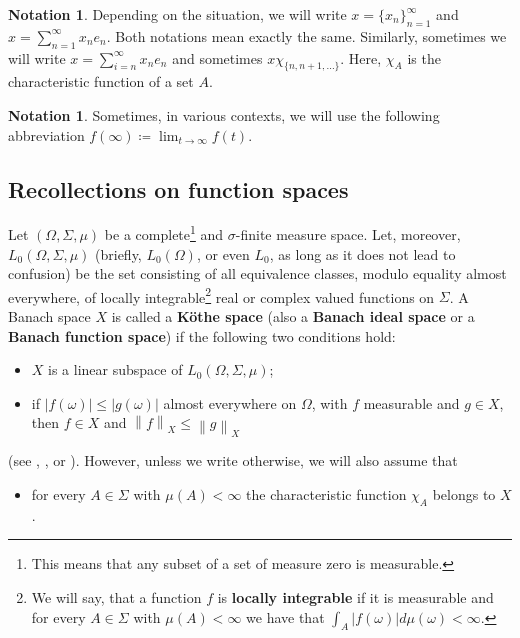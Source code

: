 \documentclass[11pt]{amsart}
\theoremstyle{definition}
\theoremstyle{definition}
\theoremstyle{definition}
\theoremstyle{definition}
\theoremstyle{definition}
\theoremstyle{definition}
\theoremstyle{definition}
\theoremstyle{definition}
\numberwithin{equation}{section}
\numberwithin{equation}{section}
\numberwithin{equation}{section}
\theoremstyle{definition}
\theoremstyle{definition}
\newtheorem{notation}[theorem]{Notation}
\theoremstyle{definition}
\theoremstyle{definition}
\theoremstyle{definition}
\theoremstyle{definition}
\newcommand{\norm}[1]{\left\lVert#1\right\rVert}
\newcommand{\abs}[1]{\left\lvert#1\right\rvert}
\begin{document}
\begin{notation}
	Depending on the situation, we will write $x = \{ x_n \}_{n=1}^{\infty}$ and $x = \sum_{n=1}^{\infty} x_n e_n$.
	Both notations mean exactly the same. Similarly, sometimes we will write $x = \sum_{i=n}^{\infty} x_n e_n$ and
	sometimes $x\chi_{\{n,n+1,...\}}$. Here, $\chi_A$ is the characteristic function of a set $A$.
\end{notation}

\begin{notation}
	Sometimes, in various contexts, we will use the following abbreviation $f(\infty) \coloneqq \lim_{t \rightarrow \infty} f(t)$.
\end{notation}

\subsection{Recollections on function spaces}
Let $(\Omega, \Sigma, \mu)$ be a complete\footnote{This means that any subset of a set of measure zero is measurable.} and
$\sigma$-finite measure space. Let, moreover, $L_0(\Omega,\Sigma,\mu)$ (briefly, $L_0(\Omega)$, or even $L_0$, as long as it does
not lead to confusion) be the set consisting of all equivalence classes, modulo equality almost everywhere, of locally
integrable\footnote{We will say, that a function $f$ is {\bf locally integrable} if it is measurable and for every $A \in \Sigma$
with $\mu(A) < \infty$ we have that $\int_{A} \abs{f(\omega)} d\mu(\omega) < \infty$.} real or complex valued functions on $\Sigma$.
A Banach space $X$ is called a {\bf K{\" o}the space} (also a {\bf Banach ideal space} or a {\bf Banach function space}) if the following two conditions hold:
\begin{itemize}
	\item[$\bullet$] $X$ is a linear subspace of $L_0(\Omega,\Sigma,\mu)$;
	\item[$\bullet$] if $\abs{f(\omega)} \leqslant \abs{g(\omega)}$ almost everywhere on $\Omega$, with $f$ measurable
	and $g \in X$, then $f \in X$ and $\norm{f}_X \leqslant \norm{g}_X$
\end{itemize}
(see \cite[pp.~1--3]{BS88}, \cite[Definition~1.1, p.~40]{KPS82}, \cite[Definition~1.b.17, p.~28]{LT79} or \cite[p.~161]{Ma89}).
However, unless we write otherwise, we will also assume that
\begin{itemize}
	\item[$\bullet$] for every $A \in \Sigma$ with $\mu(A) < \infty$ the characteristic function $\chi_{A}$ belongs to $X$.
\end{itemize}
\end{document}
